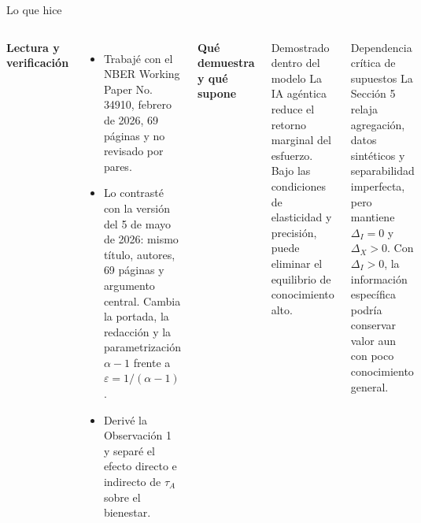 \documentclass[aspectratio=169,11pt]{beamer}
\newcommand{\azul}[1]{\textcolor{AzulMedio}{\textbf{#1}}}
\begin{document}
\begin{frame}{Lo que hice}
\begin{columns}[T,onlytextwidth]
\azul{Lectura y verificación}
\begin{itemize}\footnotesize
  \item Trabajé con el NBER Working Paper No. 34910, febrero de 2026, 69 páginas y no revisado por pares.
  \item Lo contrasté con la versión del 5 de mayo de 2026: mismo título, autores, 69 páginas y argumento central. Cambia la portada, la redacción y la parametrización $\alpha-1$ frente a $\varepsilon=1/(\alpha-1)$.
  \item Derivé la Observación 1 y separé el efecto directo e indirecto de $\tau_A$ sobre el bienestar.
\end{itemize}

\azul{Qué demuestra y qué supone}
\begin{block}{Demostrado dentro del modelo}
\small La IA agéntica reduce el retorno marginal del esfuerzo. Bajo las condiciones de elasticidad y precisión, puede eliminar el equilibrio de conocimiento alto.
\end{block}
\begin{block}{Dependencia crítica de supuestos}
\small La Sección 5 relaja agregación, datos sintéticos y separabilidad imperfecta, pero mantiene $\Delta_I=0$ y $\Delta_X>0$. Con $\Delta_I>0$, la información específica podría conservar valor aun con poco conocimiento general.
\end{block}
\end{columns}
\end{frame}
\end{document}
